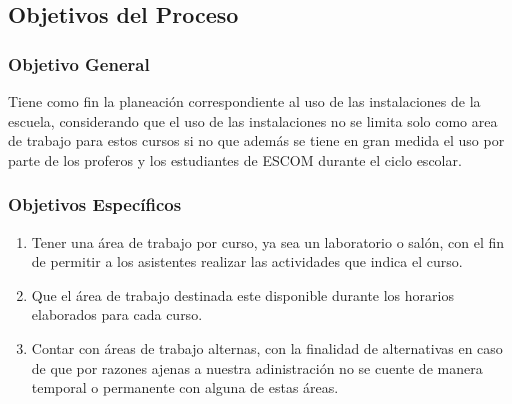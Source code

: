 
\subsection{Objetivos del Proceso} 	%

\subsubsection{Objetivo General}	%
Tiene como fin la planeación correspondiente al uso de las instalaciones de la escuela, considerando que el uso de las instalaciones no se limita solo como area de trabajo para estos cursos si no que además se tiene en gran medida el uso por parte de los proferos y los estudiantes de ESCOM durante el ciclo escolar.
\subsubsection{Objetivos Específicos}	%

\begin{enumerate}[I] 			%
	\item Tener una área de trabajo por curso, ya sea un laboratorio o salón, con el fin de permitir a los asistentes realizar las actividades que indica el curso.
	\item Que el área de trabajo destinada este disponible durante los horarios elaborados para cada curso.
	\item Contar con áreas de trabajo alternas, con la finalidad de alternativas en caso de que por razones ajenas a nuestra adinistración no se cuente de manera temporal o permanente con alguna de estas áreas.
\end{enumerate}

